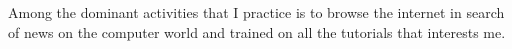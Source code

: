 \documentclass[10pt,A4]{article}
\begin{document}
\begin{minipage}{0.59\textwidth}
{		%
		\parbox[b][3cm][c]{3.5cm}{
			\begin{center}
			\textcolor{textcol}{Among the dominant activities that I practice is to browse the internet in search of news on the computer world and trained on all the tutorials that interests me.}
			\end{center}
		}
	}
	
\end{minipage}
\hspace{5pt}
\begin{minipage}{0.01\textwidth}
	\begin{center}
	\end{center}
\end{minipage}
\end{document}
